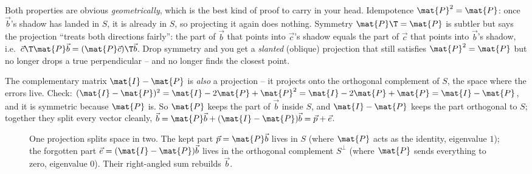 \begin{intuitionbox}
Both properties are obvious \emph{geometrically}, which is the best kind of proof to carry in your
head. Idempotence $\mat{P}^2=\mat{P}$: once $\vec{b}$'s shadow has landed in $S$, it is already in
$S$, so projecting it again does nothing. Symmetry $\mat{P}\T=\mat{P}$ is subtler but says the
projection ``treats both directions fairly'': the part of $\vec{b}$ that points into $\vec{c}$'s
shadow equals the part of $\vec{c}$ that points into $\vec{b}$'s shadow, i.e.\
$\vec{c}\T\mat{P}\vec{b} = (\mat{P}\vec{c})\T\vec{b}$. Drop symmetry and you get a \emph{slanted}
(oblique) projection that still satisfies $\mat{P}^2=\mat{P}$ but no longer drops a true
perpendicular -- and no longer finds the closest point.
\end{intuitionbox}

\begin{remark}
The complementary matrix $\mat{I}-\mat{P}$ is \emph{also} a projection -- it projects onto the
orthogonal complement of $S$, the space where the errors live. Check:
$(\mat{I}-\mat{P})^2 = \mat{I}-2\mat{P}+\mat{P}^2 = \mat{I}-2\mat{P}+\mat{P} = \mat{I}-\mat{P}$,
and it is symmetric because $\mat{P}$ is. So $\mat{P}$ keeps the part of $\vec{b}$ inside $S$, and
$\mat{I}-\mat{P}$ keeps the part orthogonal to $S$; together they split every vector cleanly,
$\vec{b} = \mat{P}\vec{b} + (\mat{I}-\mat{P})\vec{b} = \vec{p} + \vec{e}$.
\end{remark}

\begin{figure}[H]
\centering
{}
\caption{One projection splits space in two. The kept part $\vec{p}=\mat{P}\vec{b}$ lives in $S$
(where $\mat{P}$ acts as the identity, eigenvalue $1$); the forgotten part
$\vec{e}=(\mat{I}-\mat{P})\vec{b}$ lives in the orthogonal complement $S^\perp$ (where $\mat{P}$
sends everything to zero, eigenvalue $0$). Their right-angled sum rebuilds $\vec{b}$.}
\label{ch18:decomp-fig}
\end{figure}

